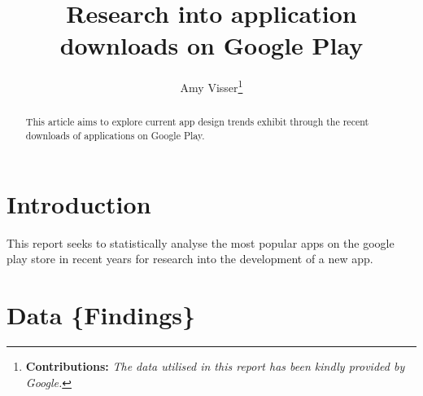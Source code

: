\documentclass[11pt,preprint, authoryear]{elsarticle}
\numberwithin{equation}{section}
\numberwithin{figure}{section}
\numberwithin{table}{section}
\let\rmarkdownfootnote\footnote%
\def\footnote{\protect\rmarkdownfootnote}
\begin{document}
\begin{frontmatter}  %

\title{Research into application downloads on Google Play}





\author[Add1]{Amy Visser\footnote{\textbf{Contributions:}
  \newline \emph{The data utilised in this report has been kindly
  provided by Google.}}}
\ead{}





\address[Add1]{Stellenbosch University, South Africa}


\begin{abstract}
\small{
This article aims to explore current app design trends exhibit through
the recent downloads of applications on Google Play.
}
\end{abstract}

\vspace{1cm}





\vspace{0.5cm}

\end{frontmatter}

\setcounter{footnote}{0}



\pagestyle{fancy}
\chead{}
\rhead{}
\lfoot{}
\lhead{}
\cfoot{}


\headsep 35pt %




\hypertarget{introduction}{%
\section{\texorpdfstring{Introduction
\label{Introduction}}{Introduction }}\label{introduction}}

This report seeks to statistically analyse the most popular apps on the
google play store in recent years for research into the development of a
new app.

\hypertarget{data-findings}{%
\section{Data \{Findings\}}\label{data-findings}}
\end{document}

